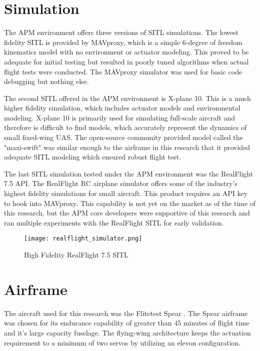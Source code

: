 \section{Simulation}
The \ac{APM} environment offers three versions of \ac{SITL} simulations.  The lowest fidelity \ac{SITL} is provided by MAVproxy, which is a simple 6-degree of freedom kinematics model with no environment or actuator modeling.  This proved to be adequate for initial testing but resulted in poorly tuned algorithms when actual flight tests were conducted.  The MAVproxy simulator was used for basic code debugging but nothing else.

The second \ac{SITL} offered in the \ac{APM} environment is X-plane 10.  This is a much higher fidelity simulation, which includes actuator models and environmental modeling.  X-plane 10 is primarily used for simulating full-scale aircraft and therefore is difficult to find models, which accurately represent the dynamics of small fixed-wing \ac{UAS}.  The open-source community provided model called the "maxi-swift" was similar enough to the airframe in this research that it provided adequate \ac{SITL} modeling which ensured robust flight test.

The last \ac{SITL} simulation tested under the \ac{APM} environment was the RealFlight 7.5 \ac{API}.  The RealFlight \ac{RC} airplane simulator offers some of the industry's highest fidelity simulations for small aircraft.  This product requires an \ac{API} key to hook into MAVproxy.  This capability is not yet on the market as of the time of this research, but the \ac{APM} core developers were supportive of this research and ran multiple experiments with the RealFlight \ac{SITL} for early validation.

\begin{figure}[h!]
 \centering
  \texttt{[image: realflight\_simulator.png]}
  \caption{High Fidelity RealFlight 7.5 \ac{SITL}}
  \label{fig:realflight_sitl}
\end{figure}


\section{Airframe}

The aircraft used for this research was the Flitetest Spear \cite{flitetest}.  The Spear airframe was chosen for its endurance capability of greater than 45 minutes of flight time and it's large capacity fuselage.  The flying-wing architecture keeps the actuation requirement to a minimum of two servos by utilizing an elevon configuration.  

